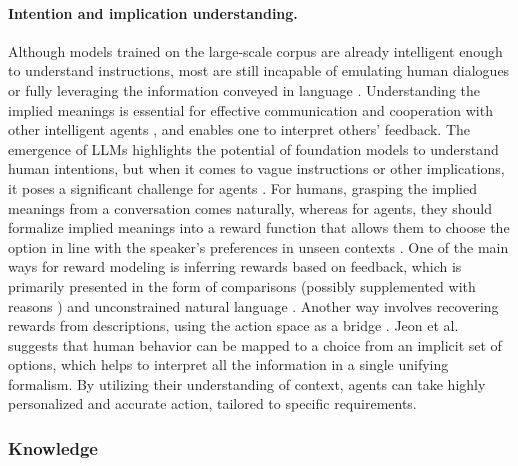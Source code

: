 \paragraph{Intention and implication understanding.}
\label{intention and implication understanding}
Although models trained on the large-scale corpus are already intelligent enough to understand instructions, most are still incapable of emulating human dialogues or fully leveraging the information conveyed in language \cite{DBLP:conf/aaai/TellexKDWBTR11}. 
Understanding the implied meanings is essential for effective communication and cooperation with other intelligent agents \cite{DBLP:journals/corr/abs-2109-01355}, and enables one to interpret others' feedback. 
The emergence of LLMs highlights the potential of foundation models to understand human intentions, but when it comes to vague instructions or other implications, it poses a significant challenge for agents \cite{DBLP:journals/corr/abs-2304-08354, DBLP:journals/corr/abs-2305-14763}. 
For humans, grasping the implied meanings from a conversation comes naturally, whereas for agents, they should formalize implied meanings into a reward function that allows them to choose the option in line with the speaker's preferences in unseen contexts \cite{DBLP:conf/acl/LinFKD22}. One of the main ways for reward modeling is inferring rewards based on feedback, which is primarily presented in the form of comparisons \cite{DBLP:conf/nips/ChristianoLBMLA17} (possibly supplemented with reasons \cite{DBLP:conf/hri/BasuSD18}) and unconstrained natural language \cite{DBLP:conf/aaai/SumersHHNG21}. Another way involves recovering rewards from descriptions, using the action space as a bridge \cite{DBLP:conf/acl/LinFKD22}. Jeon et al. \cite{DBLP:conf/nips/JeonMD20} suggests that human behavior can be mapped to a choice from an implicit set of options, which helps to interpret all the information in a single unifying formalism. By utilizing their understanding of context, agents can take highly personalized and accurate action, tailored to specific requirements.

\subsubsection{Knowledge} \label{sec:knowledge}

